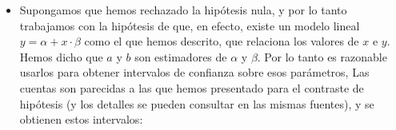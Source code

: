 \begin{itemize}
    \item Supongamos que hemos rechazado la hipótesis nula, y por lo tanto trabajamos con la hipótesis de que, en efecto, existe un modelo lineal $y=\alpha+x\cdot\beta$ como el que hemos descrito, que relaciona los valores de $x$ e $y$. Hemos dicho que $a$ y $b$ son estimadores de $\alpha$ y $\beta$. Por lo tanto es razonable usarlos para obtener intervalos de confianza sobre esos parámetros, Las cuentas son parecidas a las que hemos presentado para el contraste de hipótesis (y los detalles se pueden consultar en las mismas fuentes), y se obtienen estos intervalos:\\[3mm]
        \\[3mm]





    \end{itemize}



